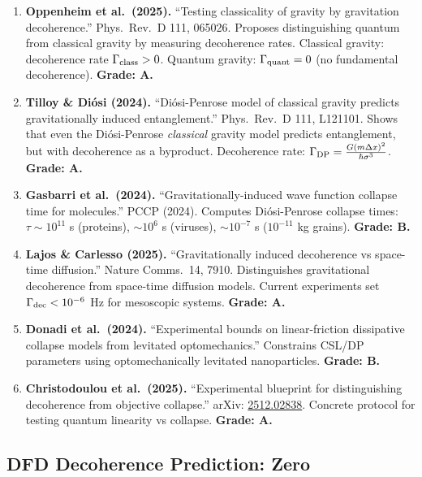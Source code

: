 \documentclass[11pt,a4paper]{article}
\begin{document}
\begin{enumerate}
\item \textbf{Oppenheim et al.\ (2025).} ``Testing classicality of gravity by gravitation decoherence.'' Phys.\ Rev.\ D 111, 065026. Proposes distinguishing quantum from classical gravity by measuring decoherence rates. Classical gravity: decoherence rate $\Gamma_{\rm class} > 0$. Quantum gravity: $\Gamma_{\rm quant} = 0$ (no fundamental decoherence). \textbf{Grade: A.}

\item \textbf{Tilloy \& Di\'{o}si (2024).} ``Di\'{o}si-Penrose model of classical gravity predicts gravitationally induced entanglement.'' Phys.\ Rev.\ D 111, L121101. Shows that even the Di\'{o}si-Penrose \emph{classical} gravity model predicts entanglement, but with decoherence as a byproduct. Decoherence rate: $\Gamma_{\rm DP} = \frac{G(m\Delta x)^2}{\hbar\sigma^3}$. \textbf{Grade: A.}

\item \textbf{Gasbarri et al.\ (2024).} ``Gravitationally-induced wave function collapse time for molecules.'' PCCP (2024). Computes Di\'{o}si-Penrose collapse times: $\tau \sim 10^{11}$ s (proteins), $\sim 10^6$ s (viruses), $\sim 10^{-7}$ s ($10^{-11}$ kg grains). \textbf{Grade: B.}

\item \textbf{Lajos \& Carlesso (2025).} ``Gravitationally induced decoherence vs space-time diffusion.'' Nature Comms.\ 14, 7910. Distinguishes gravitational decoherence from space-time diffusion models. Current experiments set $\Gamma_{\rm dec} < 10^{-6}$ Hz for mesoscopic systems. \textbf{Grade: A.}

\item \textbf{Donadi et al.\ (2024).} ``Experimental bounds on linear-friction dissipative collapse models from levitated optomechanics.'' Constrains CSL/DP parameters using optomechanically levitated nanoparticles. \textbf{Grade: B.}

\item \textbf{Christodoulou et al.\ (2025).} ``Experimental blueprint for distinguishing decoherence from objective collapse.'' arXiv: \href{https://arxiv.org/abs/2512.02838}{2512.02838}. Concrete protocol for testing quantum linearity vs collapse. \textbf{Grade: A.}
\end{enumerate}

\subsection{DFD Decoherence Prediction: Zero}
\end{document}
